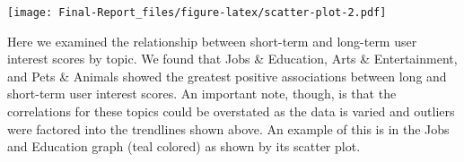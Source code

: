 \documentclass[]{article}
\newenvironment{Shaded}{\begin{snugshade}}{\end{snugshade}}
\newcommand{\DataTypeTok}[1]{\textcolor[rgb]{0.13,0.29,0.53}{#1}}
\newcommand{\KeywordTok}[1]{\textcolor[rgb]{0.13,0.29,0.53}{\textbf{#1}}}
\newcommand{\NormalTok}[1]{#1}
\newcommand{\OperatorTok}[1]{\textcolor[rgb]{0.81,0.36,0.00}{\textbf{#1}}}
\newcommand{\StringTok}[1]{\textcolor[rgb]{0.31,0.60,0.02}{#1}}
\begin{document}
\begin{Shaded}
\end{Shaded}

\texttt{[image: Final-Report\_files/figure-latex/scatter-plot-2.pdf]}

Here we examined the relationship between short-term and long-term user
interest scores by topic. We found that Jobs \& Education, Arts \&
Entertainment, and Pets \& Animals showed the greatest positive
associations between long and short-term user interest scores. An
important note, though, is that the correlations for these topics could
be overstated as the data is varied and outliers were factored into the
trendlines shown above. An example of this is in the Jobs and Education
graph (teal colored) as shown by its scatter plot.
\end{document}
